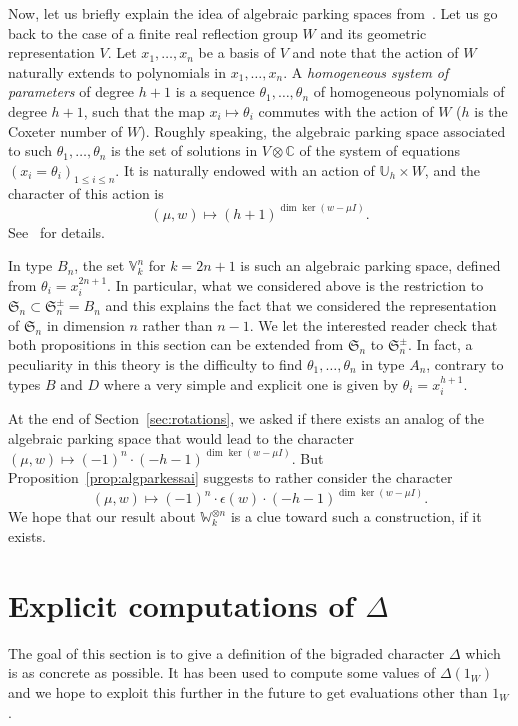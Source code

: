\documentclass[11pt]{article}
\theoremstyle{definition}
\newcommand{\bU}{\mathbb{U}}
\newcommand{\bV}{\mathbb{V}}
\newcommand{\bW}{\mathbb{W}}
\begin{document}
Now, let us briefly explain the idea of algebraic parking spaces from~\cite{armstrongreinerrhoades}.  Let us go back to the case of a finite real reflection group $W$ and its geometric representation $V$.  Let $x_1,\dots,x_n$ be a basis of $V$ and note that the action of $W$ naturally extends to polynomials in $x_1,\dots,x_n$.  A {\it homogeneous system of parameters} of degree $h+1$ is a sequence $\theta_1,\dots,\theta_n$ of homogeneous polynomials of degree $h+1$, such that the map $x_i \mapsto \theta_i$ commutes with the action of $W$ ($h$ is the Coxeter number of $W$).  Roughly speaking, the algebraic parking space associated to such $\theta_1,\dots,\theta_n$ is the set of solutions in $V\otimes \mathbb{C}$ of the system of equations $(x_i=\theta_i)_{1\leq i\leq n}$.  It is naturally endowed with an action of $\bU_h \times W$, and the character of this action is 
\[
    (\mu,w) \mapsto (h+1)^{\dim\ker(w-\mu I)}.
\]
See~\cite{armstrongreinerrhoades} for details.

In type $B_n$, the set $\bV_k^n$ for $k=2n+1$ is such an algebraic parking space, defined from $\theta_i = x_i^{2n+1}$.  In particular, what we considered above is the restriction to $\mathfrak{S}_n \subset \mathfrak{S}_n^\pm = B_n$ and this explains the fact that we considered the representation of $\mathfrak{S}_n$ in dimension $n$ rather than $n-1$.  We let the interested reader check that both propositions in this section can be extended from $\mathfrak{S}_n$ to $\mathfrak{S}_n^{\pm}$.  In fact, a peculiarity in this theory is the difficulty to find $\theta_1,\dots,\theta_n$ in type $A_n$, contrary to types $B$ and $D$ where a very simple and explicit one is given by $\theta_i = x_i^{h+1}$.  

At the end of Section~\ref{sec:rotations}, we asked if there exists an analog of the algebraic parking space that would lead to the character $(\mu,w) \mapsto (-1)^n \cdot (-h-1)^{\dim\ker(w-\mu I)}$.  But Proposition~\ref{prop:algparkessai} suggests to rather consider the character
\[
    (\mu,w) \mapsto (-1)^n \cdot \epsilon(w) \cdot (-h-1)^{\dim\ker(w-\mu I)}. 
\]
We hope that our result about $\bW_k^{\otimes n}$ is a clue toward such a construction, if it exists.

\section{\texorpdfstring{Explicit computations of $\varDelta$}{Explicit computations of ∆}}
\label{app:rca}

The goal of this section is to give a definition of the bigraded character $\varDelta$ which is as concrete as possible.  It has been used to compute some values of $\varDelta(1_W)$ and we hope to exploit this further in the future to get evaluations other than $1_W$.
\end{document}
